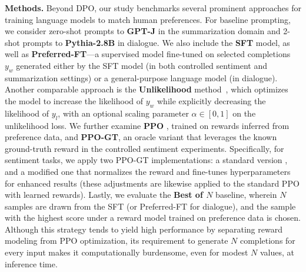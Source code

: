 \textbf{Methods.} Beyond DPO, our study benchmarks several prominent approaches for training language models to match human preferences. For baseline prompting, we consider zero-shot prompts to \textbf{GPT-J} \citep{gpt-j} in the summarization domain and 2-shot prompts to \textbf{Pythia-2.8B} \citep{biderman2023pythia} in dialogue. We also include the \textbf{SFT} model, as well as \textbf{Preferred-FT}—a supervised model fine-tuned on selected completions $y_w$ generated either by the SFT model (in both controlled sentiment and summarization settings) or a general-purpose language model (in dialogue). Another comparable approach is the \textbf{Unlikelihood} method~\citep{welleck2019neural}, which optimizes the model to increase the likelihood of $y_w$ while explicitly decreasing the likelihood of $y_l$, with an optional scaling parameter $\alpha\in[0,1]$ on the unlikelihood loss. We further examine \textbf{PPO} \citep{schulman2017proximal}, trained on rewards inferred from preference data, and \textbf{PPO-GT}, an oracle variant that leverages the known ground-truth reward in the controlled sentiment experiments. Specifically, for sentiment tasks, we apply two PPO-GT implementations: a standard version \cite{leandro_von_werra_2023_7790115}, and a modified one that normalizes the reward and fine-tunes hyperparameters for enhanced results (these adjustments are likewise applied to the standard PPO with learned rewards). Lastly, we evaluate the \textbf{Best of $N$} baseline, wherein $N$ samples are drawn from the SFT (or Preferred-FT for dialogue), and the sample with the highest score under a reward model trained on preference data is chosen. Although this strategy tends to yield high performance by separating reward modeling from PPO optimization, its requirement to generate $N$ completions for every input makes it computationally burdensome, even for modest $N$ values, at inference time.